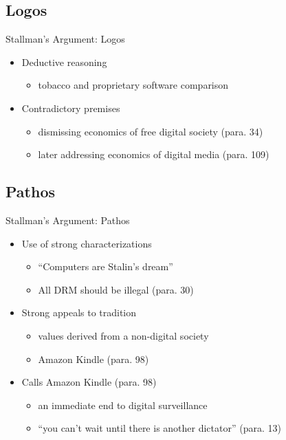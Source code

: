 \subsection{Logos}
\begin{frame}{Stallman’s Argument: Logos}
  \begin{itemize}
    \item Deductive reasoning
      \begin{itemize}
        \item tobacco and proprietary software comparison~\cite[para. 55]{rms2011}
      \end{itemize}
    \item Contradictory premises
      \begin{itemize}
        \item dismissing economics of free digital society (para. 34)
        \item later addressing economics of digital media (para. 109)
      \end{itemize}
  \end{itemize}
\end{frame}

\subsection{Pathos}
\begin{frame}{Stallman’s Argument: Pathos}
  \begin{itemize}
    \item Use of strong characterizations
      \begin{itemize}
        \item ``Computers are Stalin’s dream''~\cite[para. 3]{rms2011}
        \item All DRM should be illegal (para. 30)
      \end{itemize}
    \item Strong appeals to tradition
      \begin{itemize}
        \item values derived from a non-digital society
        \item Amazon Kindle (para. 98)
      \end{itemize}
    \item Calls Amazon Kindle (para. 98)
      \begin{itemize}
        \item an immediate end to digital surveillance
        \item “you can’t wait until there is another dictator” (para. 13)
      \end{itemize}
  \end{itemize}
\end{frame}

